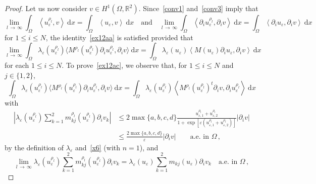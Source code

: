 \documentclass[AHL,Unicode,longabstracts,published]{cedram}
\newcommand{\bbR}{\mathbb{R}}
\newcommand{\rmd}{\mathrm{d}}
\begin{document}
\begin{proof}
Let us now consider $v\in H^1(\Omega,\bbR^2)$. Since~\eqref{conv1} and~\eqref{conv3} imply that
\begin{equation*}
\lim_{l\,\to\,\infty} \int_\Omega \left\langle u_{\varepsilon}^{\rho_l}, v \right\rangle\ \rmd x = \int_\Omega \left\langle u_{\varepsilon}, v \right\rangle\ \rmd x
\quad\text{and}\quad \lim_{l\,\to\,\infty} \int_\Omega \left\langle \partial_i u_{\varepsilon}^{\rho_l}, \partial_i v \right\rangle \ \rmd x = \int_\Omega \left\langle \partial_i u_{\varepsilon}, \partial_i v \right\rangle \ \rmd x
\end{equation*}
for $1\le i \le N$, the identity~\eqref{ex12aa} is satisfied provided that
\begin{equation}\label{ex12ac}
\lim_{l\,\to\,\infty} \int_\Omega \lambda_\varepsilon(u_{\varepsilon}^{\rho_l}) \big\langle M^{\rho_l}(u_{\varepsilon}^{\rho_l}) \partial_i u_{\varepsilon}^{\rho_l}, \partial_i v \big\rangle \ \rmd x = \int_\Omega \lambda_\varepsilon(u_{\varepsilon})\left\langle M(u_{\varepsilon}) \partial_i u_{\varepsilon}, \partial_i v \right\rangle\ \rmd x 
\end{equation}
for each $1\leq i\leq N$. To prove~\eqref{ex12ac}, we observe that, for $1\leq i\leq N$ and $j\in\{1,2\}$,
\begin{equation}\label{x7}
\int_\Omega \lambda_\varepsilon(u_\varepsilon^{\rho_l}) \big\langle M^{\rho_l}(u_{\varepsilon}^{\rho_l}) \partial_i u_{\varepsilon}^{\rho_l}, \partial_i v \big\rangle \ \rmd x = \int_\Omega \lambda_\varepsilon(u_\varepsilon^{\rho_l}) \left\langle M^{\rho_l}(u_{\varepsilon}^{\rho_l})^t \partial_i v, \partial_i u_{\varepsilon}^{\rho_l} \right\rangle \ \rmd x 
\end{equation}
with
\begin{align*}
\left| \lambda_\varepsilon(u_\varepsilon^{\rho_l}) \sum_{k=1}^2 m_{kj}^{\rho_l}(u_{\varepsilon}^{\rho_l}) \partial_i v_k \right| & \le 2\max\{a,b,c,d\} \frac{u_{\varepsilon,1}^{\rho_l} + u_{\varepsilon,2}^{\rho_l}}{1+ \exp\left[\varepsilon\left(u_{\varepsilon,1}^{\rho_l} + u_{\varepsilon,2}^{\rho_l}\right)\right]} |\partial_i v| \\
&\le \frac{2\max\{a,b,c,d\} }{\varepsilon} |\partial_i v| \qquad\text{a.e. in $\Omega$}\,,
\end{align*}
by the definition of $\lambda_\varepsilon$ and~\eqref{x6} (with $n=1$), and
\begin{equation*}
\lim_{l\,\to\,\infty} \lambda_\varepsilon(u_\varepsilon^{\rho_l}) \sum_{k=1}^2 m_{kj}^{\rho_l}(u_{\varepsilon}^{\rho_l}) \partial_i v_k = \lambda_\varepsilon(u_\varepsilon) \sum_{k=1}^2 m_{ kj}(u_{\varepsilon}) \partial_i v_k \quad\text{a.e. in $\Omega$}\,,

\end{equation*}
\end{proof}
\end{document}
